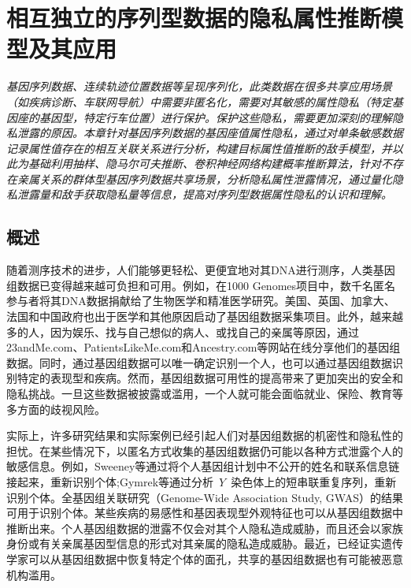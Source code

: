 \chapter{相互独立的序列型数据的隐私属性推断模型及其应用}
\label{chap:inference-attack-on-norelated-sequenced-data}

\textit{ }

\textit{基因序列数据、连续轨迹位置数据等呈现序列化，此类数据在很多共享应用场景（如疾病诊断、车联网导航）中需要非匿名化，需要对其敏感的属性隐私（特定基因座的基因型，特定行车位置）进行保护。保护这些隐私，需要更加深刻的理解隐私泄露的原因。本章针对基因序列数据的基因座值属性隐私，通过对单条敏感数据记录属性值存在的相互关联关系进行分析，构建目标属性值推断的敌手模型，并以此为基础利用抽样、隐马尔可夫推断、卷积神经网络构建概率推断算法，针对不存在亲属关系的群体型基因序列数据共享场景，分析隐私属性泄露情况，通过量化隐私泄露量和敌手获取隐私量等信息，提高对序列型数据属性隐私的认识和理解。
}

\section{概述}\label{sec:intro}

随着测序技术的进步，人们能够更轻松、更便宜地对其DNA进行测序，人类基因组数据已变得越来越可负担和可用。例如，在1000 Genomes项目\cite{gpc2015global}中，数千名匿名参与者将其DNA数据捐献给了生物医学和精准医学研究。美国、英国、加拿大、法国和中国政府也出于医学和其他原因启动了基因组数据采集项目。此外，越来越多的人，因为娱乐、找与自己想似的病人、或找自己的亲属等原因，通过23andMe.com、PatientsLikeMe.com和Ancestry.com等网站在线分享他们的基因组数据。同时，通过基因组数据可以唯一确定识别一个人，也可以通过基因组数据识别特定的表现型和疾病。然而，基因组数据可用性的提高带来了更加突出的安全和隐私挑战。一旦这些数据被披露或滥用，一个人就可能会面临就业、保险、教育等多方面的歧视风险\cite{eeoc2008genetic}。

实际上，许多研究结果和实际案例已经引起人们对基因组数据的机密性和隐私性的担忧。在某些情况下，以匿名方式收集的基因组数据仍可能以各种方式泄露个人的敏感信息。例如，Sweeney等\cite{sweeney2013identifying}通过将个人基因组计划中不公开的姓名和联系信息链接起来，重新识别个体;Gymrek等\cite{gymrek2013identifying}通过分析~$Y$~染色体上的短串联重复序列，重新识别个体。全基因组关联研究（Genome-Wide Association Study, GWAS）的结果可用于识别个体\cite{cai2015deterministic}。某些疾病的易感性\cite{shringarpure2015privacy}和基因表现型外观特征\cite{walsh2011irisplex}也可以从基因组数据中推断出来。个人基因组数据的泄露不仅会对其个人隐私造成威胁，而且还会以家族身份\cite{rohlfs2012familial}或有关亲属基因型信息的形式对其亲属的隐私造成威胁\cite{humbert2013addressing}。最近，已经证实遗传学家可以从基因组数据中恢复特定个体的面孔\cite{hess2017controversial}，共享的基因组数据也有可能被恶意机构滥用\cite{scutti2018what}。


